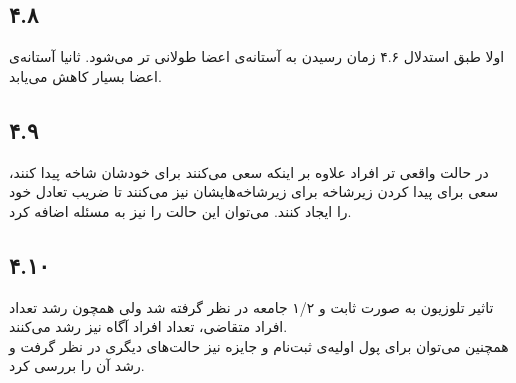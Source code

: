 \documentclass[12pt,a4paper]{article}
\begin{document}
\subsection*{۴.۸}
اولا طبق استدلال ۴.۶ زمان رسیدن به آستانه‌ی اعضا طولانی تر می‌شود. ثانیا آستانه‌ی اعضا بسیار کاهش می‌یابد.
\subsection*{۴.۹}
در حالت واقعی تر افراد علاوه بر اینکه سعی می‌کنند برای خودشان شاخه پیدا کنند، سعی برای پیدا کردن زیرشاخه برای زیرشاخه‌هایشان نیز می‌کنند تا ضریب تعادل خود را ایجاد کنند. می‌توان این حالت را نیز به مسئله اضافه کرد.
\subsection*{۴.۱۰}
تاثیر تلوزیون به صورت ثابت و ۱/۲ جامعه در نظر گرفته شد ولی همچون رشد تعداد افراد متقاضی، تعداد افراد آگاه نیز رشد می‌کنند.
\\
همچنین می‌توان برای پول اولیه‌ی ثبت‌نام و جایزه نیز حالت‌های دیگری در نظر گرفت و رشد آن را بررسی کرد.
\end{document}
